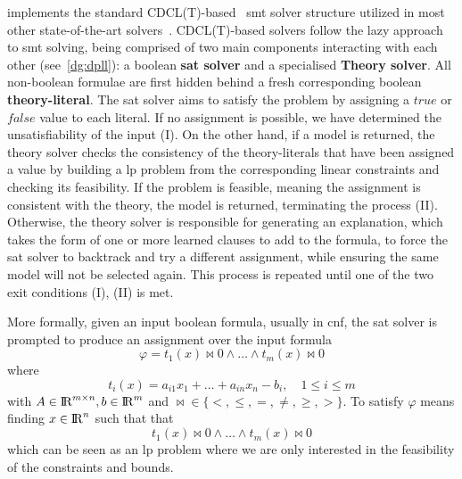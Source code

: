 \documentclass[runningheads]{llncs}
\begin{document}
\dlinear implements the standard CDCL(T)-based~\cite{ref:dpll-t} \gls{smt} solver structure utilized in most other state-of-the-art solvers~\cite{ref:cvc5}.
CDCL(T)-based solvers follow the lazy approach to \gls{smt} solving, being comprised of two main components interacting with each other (see~\autoref{dg:dpll}): a boolean \textbf{\gls{sat} solver} and a specialised \textbf{Theory solver}.
All non-boolean formulae are first hidden behind a fresh corresponding boolean \textbf{theory-literal}.
The \gls{sat} solver aims to satisfy the problem by assigning a $true$ or $false$ value to each literal.
If no assignment is possible, we have determined the unsatisfiability of the input (I).
On the other hand, if a model is returned, the theory solver checks the consistency of the theory-literals that have been assigned a value by building a \gls{lp} problem from the corresponding linear constraints and checking its feasibility.
If the problem is feasible, meaning the assignment is consistent with the theory, the model is returned, terminating the process (II).
Otherwise, the theory solver is responsible for generating an explanation, which takes the form of one or more learned clauses to add to the formula, to force the \gls{sat} solver to backtrack and try a different assignment, while ensuring the same model will not be selected again.
This process is repeated until one of the two exit conditions (I), (II) is met.


More formally, given an input boolean formula, usually in \gls{cnf}, the \gls{sat} solver is prompted to produce an assignment over the input formula
\begin{equation} %
    \label{eq:smt-formula}
    \varphi = t_1(x) \bowtie 0 \wedge \ldots \wedge t_m (x) \bowtie 0
\end{equation}
where
\begin{equation*}
    t_i(x) = a_{i1}x_1 + \ldots + a_{in}x_n - b_i, \quad 1 \le i \le m
\end{equation*}
with $A \in {\rm I\!R}^{m \times n}, b \in {\rm I\!R}^m$ and $\bowtie \in \{<, \le, =, \ne, \ge, >\}$.
To satisfy $\varphi$ means finding $x \in {\rm I\!R}^n $ such that that
\begin{equation*}
    t_1(x) \bowtie 0 \wedge \ldots \wedge t_m(x) \bowtie 0
\end{equation*}
which can be seen as an \gls{lp} problem where we are only interested in the feasibility of the constraints and bounds.
\end{document}
